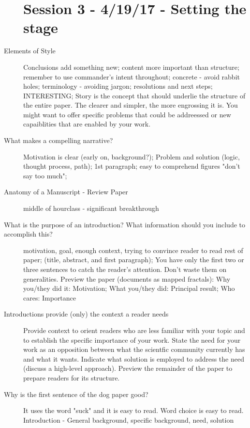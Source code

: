 \documentclass[10pt]{article}
\begin{document}
\begin{description}
\section{Session 3 - 4/19/17 - Setting the stage}
\item[Elements of Style]
  Conclusions add something new;
  content more important than structure;
  remember to use commander's intent throughout;
  concrete - avoid rabbit holes;
  terminology - avoiding jargon;
  resolutions and next steps;
  INTERESTING;
  Story is the concept that should underlie the structure of the entire paper. The clearer and simpler, the more engrossing it is.
  You might want to offer specific problems that could be addreessed or new capaiblities that are enabled by your work.
\item[What makes a compelling narrative?]
  Motivation is clear (early  on, background?);
  Problem and solution (logic, thought process, path);
  1st paragraph;
  easy to comprehend figures "don't say too much";
\item[Anatomy of a Manuscript - Review Paper]
  middle of hourclass - significant breakthrough
\item[What is the purpose of an introduction? What information should you include to accomplish this?]
  motivation, goal, enough context, trying to convince reader to read rest of paper;
  (title, abstract, and first paragraph);
  You have only the first two or three sentences to catch the reader's attention.
  Don't waste them on generalities.
  Preview the paper (documents  as mapped fractals):
    Why you/they did it: Motivation;
    What you/they did: Principal result;
    Who cares: Importance
\item[Introductions provide (only) the context a reader needs]
  Provide context to orient readers who are less familiar with your topic and to establish the specific importance of your work.
  State the need for your work as an opposition between what the scientfic community currently has and what it wants.
  Indicate what solution is employed to address the need (discuss a high-level approach).
  Preview the remainder of the paper to prepare readers for its structure.
\item[Why is the first sentence of the dog paper good?]
  It uses the word "suck" and it is easy to read.
  Word choice is easy to read.
  Introduction - General background, specific background, need, solution
\end{description}
\end{document}
